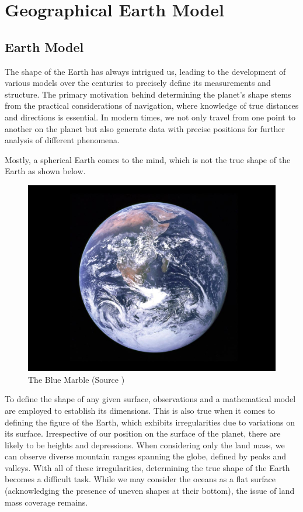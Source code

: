 

\section{Geographical Earth Model}

\subsection{Earth Model}

The shape of the Earth has always intrigued us, leading to the development of various models over the centuries to precisely define its measurements and structure.
The primary motivation behind determining the planet's shape stems from the practical considerations of navigation, where knowledge of true distances and directions is essential.
In modern times, we not only travel from one point to another on the planet but also generate data with precise positions for further analysis of different phenomena.


Mostly, a spherical Earth comes to the mind, which is not the true shape of the Earth as shown below.

\begin{figure}[h]
    \centering
    \includegraphics[width=0.5\linewidth]{figures/chapter-2/earth.jpg}
    \caption{The Blue Marble (Source \cite{EARTH_IMAGE}) }
    \label{fig:earth}
\end{figure}


To define the shape of any given surface, observations and a mathematical model are employed to establish its dimensions.
This is also true when it comes to defining the figure of the Earth, which exhibits irregularities due to variations on its surface.
Irrespective of our position on the surface of the planet, there are likely to be heights and depressions. When considering only the land mass, we can observe diverse mountain
ranges spanning the globe, defined by peaks and valleys.
With all of these irregularities, determining the true shape of the Earth becomes a difficult task.
While we may consider the oceans as a flat surface (acknowledging the presence of uneven shapes at their bottom), the issue of land mass coverage remains.

